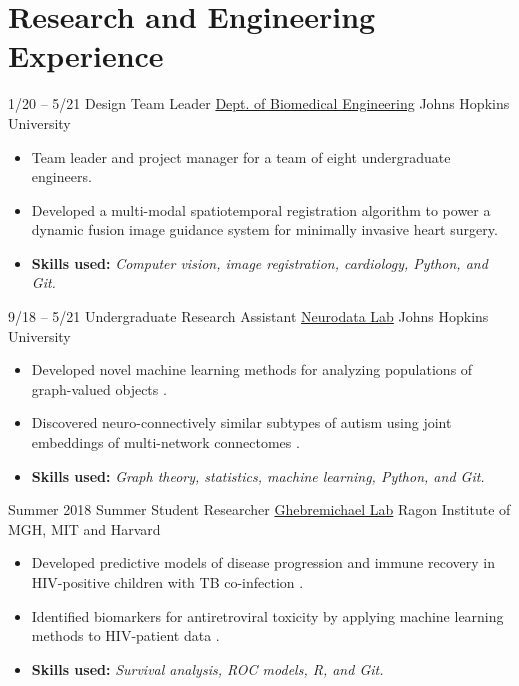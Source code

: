 \section{Research and Engineering Experience}
\cventry
{1/20 -- 5/21}
{Design Team Leader}
{\href{https://cbid.bme.jhu.edu/academics/undergraduate-studies/}{Dept. of Biomedical Engineering}}
{Johns Hopkins University}
{}
{
\begin{itemize}
    \item Team leader and project manager for a team of eight undergraduate engineers.
    \item Developed a multi-modal spatiotemporal registration algorithm to power a dynamic fusion image guidance system for minimally invasive heart surgery.
    \item \textbf{Skills used:} \textit{Computer vision, image registration, cardiology, Python, and Git.}
\end{itemize}{}
}

\cventry
{9/18 -- 5/21}
{Undergraduate Research Assistant}
{\href{https://neurodata.io}{Neurodata Lab}}
{Johns Hopkins University}
{}
{
\begin{itemize}
    \item Developed novel machine learning methods for analyzing populations of graph-valued objects \cite{gopalakrishnanMultiscaleComparativeConnectomics2020, chungStatisticalConnectomics2020b}.
    \item Discovered neuro-connectively similar subtypes of autism using joint embeddings of multi-network connectomes \cite{wangVariabilityHeritabilityMouse2020, gopalakrishnanBMES2019}.
    \item \textbf{Skills used:} \textit{Graph theory, statistics, machine learning, Python, and Git.}
\end{itemize}
}

\cventry
{Summer 2018}
{Summer Student Researcher}
{\href{http://www.ragoninstitute.org/portfolio-item/ghebremichael/}{Ghebremichael Lab}}
{Ragon Institute of MGH, MIT and Harvard}
{}
{
\begin{itemize}
    \item Developed predictive models of disease progression and immune recovery in HIV-positive children with TB co-infection \cite{gopalakrishnanPreHAARTCD4Tlymphocytes2020}.
    \item Identified biomarkers for antiretroviral toxicity by applying machine learning methods to HIV-patient data \cite{leeComparisonMachineLearning2019a}.
    \item \textbf{Skills used:} \textit{Survival analysis, ROC models, R, and Git.}
\end{itemize}{}
}


